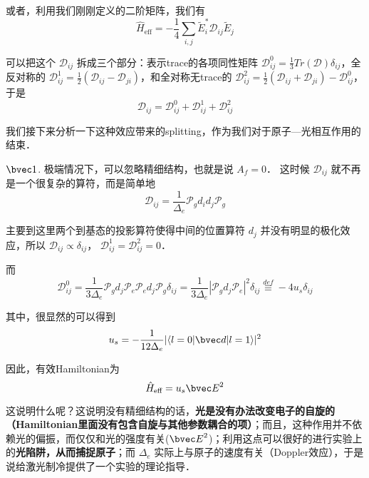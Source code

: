 或者，利用我们刚刚定义的二阶矩阵，我们有
\begin{equation}
\hat{H}_{\text{eff}} = -\frac{1}{4}\sum_{i,j} \tilde{E}_i^* \mathcal{D}_{ij} \tilde{E}_j
\end{equation}

可以把这个 $\mathcal{D}_{ij}$ 拆成三个部分：表示trace的各项同性矩阵 $\mathcal{D}_{ij}^0 = \frac{1}{3}Tr(\mathcal{D})\delta_{ij}$，全反对称的 $\mathcal{D}_{ij}^1 = \frac{1}{2}(\mathcal{D}_{ij} - \mathcal{D}_{ji})$，和全对称无trace的 $\mathcal{D}_{ij}^2 = \frac{1}{2}(\mathcal{D}_{ij} + \mathcal{D}_{ji}) - \mathcal{D}_{ij}^0$，于是
\begin{equation}
\mathcal{D}_{ij} = \mathcal{D}_{ij}^0 + \mathcal{D}_{ij}^1 + \mathcal{D}_{ij}^2
\end{equation}

我们接下来分析一下这种效应带来的splitting，作为我们对于原子—光相互作用的结束．

$\bvec 1$. 极端情况下，可以忽略精细结构，也就是说 $A_f = 0$． 这时候 $\mathcal{D}_{ij}$ 就不再是一个很复杂的算符，而是简单地
\begin{equation}
\mathcal{D}_{ij} = \frac{1}{\Delta_e}\mathcal{P}_g d_i d_j \mathcal{P}_g
\end{equation}

主要到这里两个到基态的投影算符使得中间的位置算符 $d_j$ 并没有明显的极化效应，所以 $\mathcal{D}_{ij} \propto \delta_{ij}$， $\mathcal{D}_{ij} ^1 = \mathcal{D}_{ij} ^2 = 0$．

而
\begin{equation}
\mathcal{D}_{ij}^0 = \frac{1}{3\Delta_e} \mathcal{P}_g d_j \mathcal{P}_e \mathcal{P}_e d_j \mathcal{P}_g \delta_{ij}= \frac{1}{3\Delta_e} |\mathcal{P}_g d_j \mathcal{P}_e|^2\delta_{ij}\overset{def}{\equiv} -4u_s \delta_{ij}
\end{equation}

其中，很显然的可以得到
\begin{equation}
u_s = -\frac{1}{12\Delta_e} |\langle l=0|{\bvec d}|l = 1\rangle|^2
\end{equation}

因此，有效Hamiltonian为
\begin{equation}
\hat{H}_{\text{eff}} = u_s {\bvec E}^2
\end{equation}

这说明什么呢？这说明没有精细结构的话，\textbf{光是没有办法改变电子的自旋的（Hamiltonian里面没有包含自旋与其他参数耦合的项）}；而且，这种作用并不依赖光的偏振，而仅仅和光的强度有关(${\bvec E}^2$)；利用这点可以很好的进行实验上的\textbf{光陷阱，从而捕捉原子}；而 $\Delta_e$ 实际上与原子的速度有关（Doppler效应），于是说给激光制冷提供了一个实验的理论指导．

